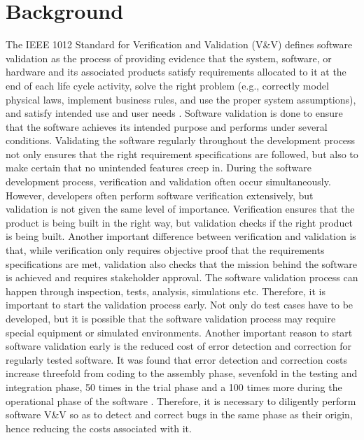 \documentclass[journal, onecolumn]{IEEEtran}
\begin{document}
	\section{Background}
	\bigskip
	The IEEE 1012 Standard for Verification and Validation (V{\&}V) defines software validation as the process of providing evidence that the system, software, or hardware and its associated products satisfy requirements allocated to it at the end of each life cycle activity, solve the right problem (e.g., correctly model physical laws, implement business rules, and use the proper system assumptions), and satisfy intended use and user needs \cite{standard}. Software validation is done to ensure that the software achieves its intended purpose and performs under several conditions. Validating the software regularly throughout the development process not only ensures that the right requirement specifications are followed, but also to make certain that no unintended features creep in. 
	\newline \newline
	During the software development process, verification and validation often occur simultaneously. However, developers often perform software verification extensively, but validation is not given the same level of importance. Verification ensures that the product is being built in the right way, but validation checks if the right product is being built. Another important difference between verification and validation is that, while verification only requires objective proof that the requirements specifications are met, validation also checks that the mission behind the software is achieved and requires stakeholder approval.
	\newline \newline
	The software validation process can happen through inspection, tests, analysis, simulations etc. Therefore, it is important to start the validation process early. Not only do test cases have to be developed, but it is possible that the software validation process may require special equipment or simulated environments. 
	\newline \newline
	Another important reason to start software validation early is the reduced cost of error detection and correction for regularly tested software. It was found that error detection and correction costs increase threefold from coding to the assembly phase, sevenfold in the testing and integration phase, 50 times in the trial phase and a 100 times more during the operational phase of the software \cite{chapter7}. Therefore, it is necessary to diligently perform software V\&V so as to detect and correct bugs in the same phase as their origin, hence reducing the costs associated with it.
\end{document}
